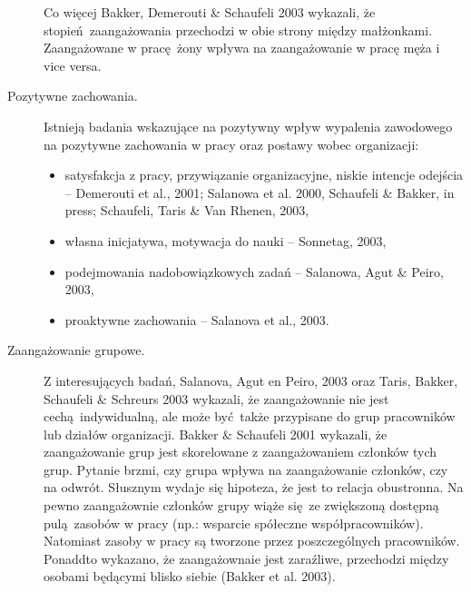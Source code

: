 \begin{description}
Co więcej Bakker, Demerouti \& Schaufeli 2003 wykazali, że stopień zaangażowania przechodzi w obie strony między małżonkami. Zaangażowane w pracę żony wpływa na zaangażowanie w pracę męża i vice versa.
\item[Pozytywne zachowania.]
Istnieją badania wskazujące na pozytywny wpływ wypalenia zawodowego na pozytywne zachowania w pracy oraz postawy wobec organizacji:
\begin{itemize}
\item satysfakcja z pracy, przywiązanie organizacyjne, niskie intencje odejścia -- Demerouti et al., 2001; Salanowa et al. 2000, Schaufeli \& Bakker, in press; Schaufeli, Taris \& Van Rhenen, 2003,
\item własna inicjatywa, motywacja do nauki -- Sonnetag, 2003,
\item podejmowania nadobowiązkowych zadań -- Salanowa, Agut \& Peiro, 2003,
\item proaktywne zachowania -- Salanova et al., 2003.
\end{itemize}
\item[Zaangażowanie grupowe.]
Z interesujących badań, Salanova, Agut en Peiro, 2003 oraz Taris, Bakker, Schaufeli \& Schreurs 2003 wykazali, że zaangażowanie nie jest cechą indywidualną, ale może być także przypisane do grup pracowników lub działów organizacji. Bakker \& Schaufeli 2001 wykazali, że zaangażowanie grup jest skorelowane z zaangażowaniem członków tych grup. Pytanie brzmi, czy grupa wpływa na zaangażowanie członków, czy na odwrót. Słusznym wydaje się hipoteza, że jest to relacja
obustronna. Na pewno zaangażownie członków grupy wiąże się ze zwiększoną dostępną pulą zasobów w pracy (np.: wsparcie spółeczne współpracowników). Natomiast zasoby w pracy są tworzone przez poszczególnych pracowników. Ponaddto wykazano, że zaangażownaie jest zaraźliwe, przechodzi między osobami będącymi blisko siebie (Bakker et al. 2003).

\end{description}
